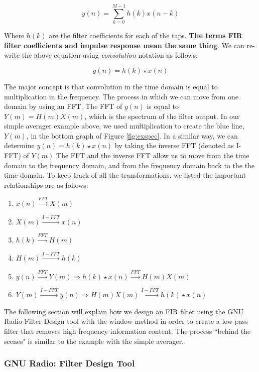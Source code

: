 $$y(n) = \sum_{k=0}^{M-1}  h(k)x(n-k)$$

Where $h(k)$ are the filter coefficients for each of the taps.
\textbf{The terms FIR filter coefficients and impulse response
mean the same thing}\cite{lyons:intro}. We can re-write the above
equation using \textit{convolution} notation as follows:

$$y(n) = h(k) \star x(n)$$  

The major concept is that convolution in the time domain is equal
to multiplication in the frequency. The process in which we can
move from one domain by using an FFT. The FFT of $y(n)$ is equal
to $Y(m) = H(m) X(m)$, which is the spectrum of the filter
output. In our simple averager example above, we used
multiplication to create the blue line, $Y(m)$, in the bottom
graph of Figure \ref{fig:exspec}. In a similar way, we can
determine $y(n) = h(k)\star x(n)$ by taking the inverse FFT
(denoted as I-FFT) of $Y(m)$ \cite{lyons:intro} The FFT and the
inverse FFT allow us to move from the time domain to the
frequency domain, and from the frequency domain back to the the
time domain. To keep track of all the transformations, we listed
the important relationships are as follows: \\

\begin{enumerate}
\item $x(n) \overset{FFT}{\longrightarrow} X(m)$
\item $X(m) \overset{I-FFT}{\longrightarrow} x(n)$
\item $h(k) \overset{FFT}{\longrightarrow} H(m)$
\item $H(m) \overset{I-FFT}{\longrightarrow} h(k)$
\item $y(n) \overset{FFT}{\longrightarrow} Y(m) \Rightarrow h(k)\star x(n) \overset{FFT}{\longrightarrow} H(m) X(m)$
\item $Y(m) \overset{I-FFT}{\longrightarrow} y(n) \Rightarrow H(m) X(m) \overset{I-FFT}{\longrightarrow} h(k)\star x(n)$\\
\end{enumerate}    

The following section will explain how we design an FIR filter
using the GNU Radio Filter Design tool with the window method in
order to create a low-pass filter that removes high frequency
information content. The process ``behind the scenes" is similar
to the example with the simple averager.  

\subsubsection{GNU Radio: Filter Design Tool}

